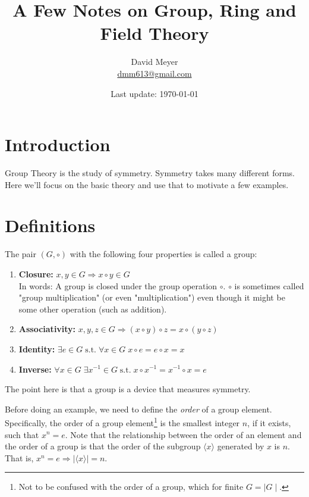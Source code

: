 \documentclass{article}
\title{A Few Notes on Group, Ring and Field Theory}
\author{David Meyer \\ \href{mailto:dmm613@gmail.com}
                            {dmm613@gmail.com}}
\date{Last update: \today}
\theoremstyle{definition}
\begin{document}
\maketitle

\section{Introduction}
Group Theory is the study of symmetry. Symmetry takes many
different forms. Here we'll focus on the basic theory and use
that to motivate a few examples.

\section{Definitions}
The pair $(G,\circ)$ with the following four properties is called
a group: 

\begin{enumerate}
\item \textbf{Closure:} $x, y \in G \Rightarrow x \circ y \in G$
\\ In words: A group is closed under the group operation
$\circ$. $\circ$ is sometimes called "group multiplication" (or
even "multiplication") even though it might be some other
operation (such as addition).

\item \textbf{Associativity:} $x,y,z \in G \Rightarrow  (x \circ
y) \circ z = x \circ (y \circ z)$ 

\item \textbf{Identity:} $\exists e \in G \;  \text{s.t.} \;
\forall x \in G \; x \circ e = e \circ x = x$ 

\item \textbf{Inverse:} $\forall x \in G \;  \exists x^{-1} \in G
\;  \text{s.t.} \;  x \circ x^{-1} = x^{-1} \circ x = e$ 
\end{enumerate}

\bigskip
\noindent
The point here is that a group is a device that measures
symmetry.  

\bigskip
\noindent
Before doing an example, we need to define the \emph{order} of a
group element. Specifically, the order of a group
element\footnote{Not to be confused with the order of a group,
which for finite $G = \mid G \mid$.}  is the smallest integer
$n$, if it exists, such that $x^n = e$. Note that the
relationship between the order of an element and the order of a
group is that the order of the subgroup $\langle x \rangle$
generated by $x$ is $n$. That is, $x^n = e \Rightarrow | \langle
x \rangle | = n$.
\end{document}
